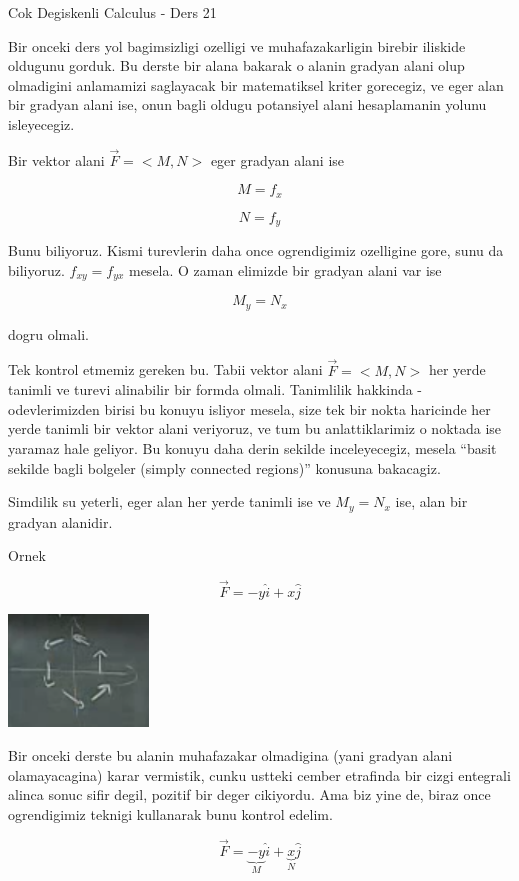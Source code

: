 \documentclass[12pt,fleqn]{article}
\begin{document}
Cok Degiskenli Calculus - Ders 21

Bir onceki ders yol bagimsizligi ozelligi ve muhafazakarligin birebir
iliskide oldugunu gorduk. Bu derste bir alana bakarak o alanin gradyan
alani olup olmadigini anlamamizi saglayacak bir matematiksel kriter
gorecegiz, ve eger alan bir gradyan alani ise, onun bagli oldugu potansiyel
alani hesaplamanin yolunu isleyecegiz. 

Bir vektor alani $\vec{F} = <M,N>$ eger gradyan alani ise 

\[ M = f_x \]

\[ N = f_y \]

Bunu biliyoruz. Kismi turevlerin daha once ogrendigimiz ozelligine
gore, sunu da biliyoruz. $f_{xy} = f_{yx}$ mesela. O zaman elimizde bir
gradyan alani var ise

\[ M_y = N_x \]

dogru olmali. 

Tek kontrol etmemiz gereken bu. Tabii vektor alani $\vec{F} = <M,N>$ her
yerde tanimli ve turevi alinabilir bir formda olmali. Tanimlilik hakkinda -
odevlerimizden birisi bu konuyu isliyor mesela, size tek bir nokta
haricinde her yerde tanimli bir vektor alani veriyoruz, ve tum bu
anlattiklarimiz o noktada ise yaramaz hale geliyor. Bu konuyu daha derin
sekilde inceleyecegiz, mesela ``basit sekilde bagli bolgeler (simply
connected regions)'' konusuna bakacagiz. 

Simdilik su yeterli, eger alan her yerde tanimli ise ve $M_y = N_x$ ise,
alan bir gradyan alanidir. 

Ornek 

\[ \vec{F} = -y\hat{i} + x\hat{j} \]

\includegraphics[height=3cm]{21_1.png}

Bir onceki derste bu alanin muhafazakar olmadigina (yani gradyan alani
olamayacagina) karar vermistik, cunku ustteki cember etrafinda bir cizgi
entegrali alinca sonuc sifir degil, pozitif bir deger cikiyordu. Ama biz
yine de, biraz once ogrendigimiz teknigi kullanarak bunu kontrol edelim.

\[ \vec{F} = \underbrace{-y}_{M}\hat{i} + 
\underbrace{x}_{N}\hat{j} 
\]
\end{document}
